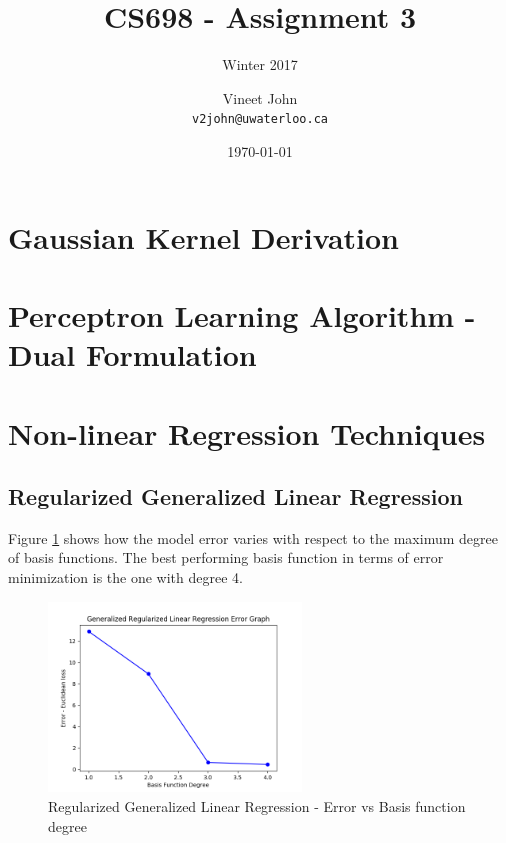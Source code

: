 \documentclass[parskip=full]{scrartcl}
\begin{document}
\title{CS698 - Assignment 3}
\subtitle{Winter 2017}
\author{
    Vineet John\\
    \texttt{v2john@uwaterloo.ca}
}
\date{\today}
\maketitle


\section{Gaussian Kernel Derivation} %
\label{sec:gaussian_kernel_derivation}





\section{Perceptron Learning Algorithm - Dual Formulation} %
\label{sec:perceptron_learning_algorithm_dual_formulation}





\section{Non-linear Regression Techniques} %
\label{sec:non_linear_regression_techniques}

    \subsection{Regularized Generalized Linear Regression} %
    \label{sub:regularized_generalized_linear_regression}
    
        Figure \ref{fig:rglg_err_v_deg} shows how the model error varies with respect to the maximum degree of basis functions. The best performing basis function in terms of error minimization is the one with degree 4.

        \begin{figure}[ht]
            \centering
            \includegraphics[width=0.6\textwidth]{3a_degree_vs_error.png}
            \caption{Regularized Generalized Linear Regression - Error vs Basis function degree}
            \label{fig:rglg_err_v_deg}
        \end{figure}
\end{document}
